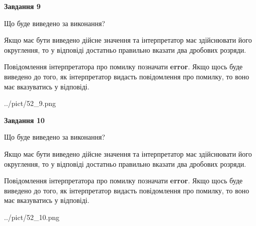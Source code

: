 \documentclass[12pt, ukrainian]{article}
\begin{document}
{\begin {Large}
{\begin {center}\textbf{Завдання 9}\end {center}}\par
Що буде виведено за виконання? \par

Якщо має бути виведено дійсне значення та інтерпретатор має здійснювати його округлення, 
то у відповіді достатньо правильно вказати два дробових розряди.

Повідомлення інтерпретатора про помилку позначати \textbf{error}.
Якщо щось буде виведено до того, як інтерпретатор видасть повідомлення про помилку, 
то воно має вказуватись у відповіді. \par

\begin{center}
	{../pict/52_9.png}
\end{center}
\newpage

{\begin {center}\textbf{Завдання 10}\end {center}}\par
Що буде виведено за виконання? \par

Якщо має бути виведено дійсне значення та інтерпретатор має здійснювати його округлення, 
то у відповіді достатньо правильно вказати два дробових розряди.

Повідомлення інтерпретатора про помилку позначати \textbf{error}.
Якщо щось буде виведено до того, як інтерпретатор видасть повідомлення про помилку, 
то воно має вказуватись у відповіді. \par

\begin{center}
	{../pict/52_10.png}
\end{center}
\newpage

\end {Large}}
\end{document}
